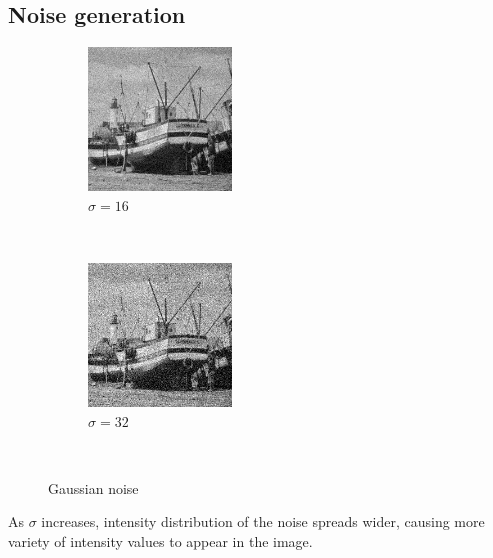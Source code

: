\documentclass[12pt]{article}
\begin{document}
\subsection*{Noise generation}
\begin{figure}[ht!]
    \centering
    \begin{subfigure}[t]{0.3\textwidth}
        \centering
        \includegraphics[height=1.5in]{images/G1}
        \caption{$\sigma=16$}
    \end{subfigure}%
    ~ 
    \begin{subfigure}[t]{0.3\textwidth}
        \centering
        \includegraphics[height=1.5in]{images/G2}
        \caption{$\sigma=32$}
    \end{subfigure}%
    ~
    \caption{Gaussian noise}
\end{figure}
As $\sigma$ increases, intensity distribution of the noise spreads wider, causing more variety of intensity values to appear in the image.
\end{document}
